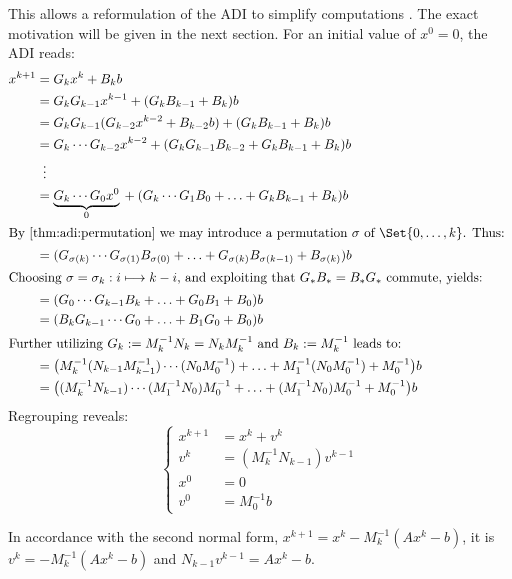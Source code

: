 This allows a reformulation of the \ac{ADI} to simplify computations \cite{Li2002}.
The exact motivation will be given in the next section.
For an initial value of $x^0 = 0$,
the ADI reads:
\begin{align*}
  x^{k+1}
  &= G_k x^k + B_k b \\
  &= G_k G_{k-1} x^{k-1} + (G_k B_{k-1} + B_k) b \\
  &= G_k G_{k-1} (G_{k-2} x^{k-2} + B_{k-2}b) + (G_k B_{k-1} + B_k) b \\
  &= G_k \cdots G_{k-2} x^{k-2} + (G_k G_{k-1} B_{k-2} + G_k B_{k-1} + B_k) b \\
  &\vdotswithin{=} \\
  &= \underbrace{G_k \cdots G_0 x^0}_0 {} + (G_k \cdots G_1 B_0 + \ldots + G_k B_{k-1} + B_k) b \\
\intertext{%
  By \autoref{thm:adi:permutation} we may introduce a permutation $\sigma$ of $\Set{0,\ldots,k}$.
  Thus:
}
  &= (G_{\sigma(k)} \cdots G_{\sigma(1)} B_{\sigma(0)} + \ldots + G_{\sigma(k)} B_{\sigma(k-1)} + B_{\sigma(k)}) b \\
\intertext{%
  Choosing $\sigma = \sigma_k : i \mapsto k-i$,
  and exploiting that $G_* B_* = B_* G_*$ commute,
  yields:
}
  &= (G_0 \cdots G_{k-1} B_k + \ldots + G_0 B_1 + B_0) b \\
  &= (B_k G_{k-1} \cdots G_0 + \ldots + B_1 G_0 + B_0) b \\
\intertext{%
  Further utilizing $G_k := M_k^{-1} N_k = N_k M_k^{-1}$ and $B_k := M_k^{-1}$ leads to:
}
  &= \big( M_k^{-1} (N_{k-1} M_{k-1}^{-1}) \cdots (N_0 M_0^{-1}) + \ldots + M_1^{-1} (N_0 M_0^{-1}) + M_0^{-1} \big) b \\
  &= \big( (M_k^{-1} N_{k-1}) \cdots (M_1^{-1} N_0) M_0^{-1} + \ldots + (M_1^{-1} N_0) M_0^{-1} + M_0^{-1} \big) b
\end{align*}
Regrouping reveals:
\begin{equation}
\label{eq:adi:recursion}
\left\{
\begin{aligned}
  x^{k+1} &= x^k + v^k \\
  v^k &= (M_k^{-1} N_{k-1}) v^{k-1} \\
  x^0 &= 0 \\
  v^0 &= M_0^{-1} b
\end{aligned}
\right.
\end{equation}

\begin{remark}
  In accordance with the second normal form,
  $x^{k+1} = x^k - M_k^{-1} (Ax^k - b)$, it is
  $v^k = - M_k^{-1} (Ax^k - b)$ and
  $N_{k-1} v^{k-1} = Ax^k - b$.
\end{remark}

